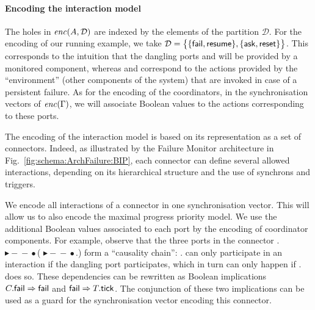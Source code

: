 \documentclass{llncs}
\newcommand{\Simon}{\\\hfill\mdash Simon}
\newcommand{\noteSB}[2][color=green!40, size=\tiny]{\todo[#1]{{#2}\Simon}}
\newcommand{\Ludo}{\\\hfill\mdash Ludo}
\newcommand{\noteLH}[2][color=orange!40, size=\tiny]{\todo[#1]{{#2}\Ludo}}
\newcommand{\add}[2][Added]{\todo[color=blue!20, size=\tiny]{#1}{\color{blue}#2}}
\newcommand{\addSB}[1]{\add[Added by Simon]{#1}}
\newcommand{\tupleDeli}{(}
\newcommand{\tupleDelii}{)}
\newcommand{\setTupleDelims}[2][(]{
  \renewcommand{\tupleDeli}{#1}%
  \ifx#2\relax\else\renewcommand{\tupleDelii}{#2}\fi%
}
\newcommand{\tuplebase}[2][\ensuremath{,\allowbreak}]{%
  \def\nextitem{\def\nextitem{#1}}%
  \renewcommand*{\do}[1]{\nextitem ##1}%
  \tupleDeli\docsvlist{#2}\tupleDelii%
}
\newcommand{\pNetTuple}[2][\ensuremath{,\allowbreak}]{%
  \setTupleDelims[\mylangle]{\myrangle}%
  \tuplebase[#1]{#2}%
}
\newcommand{\fig}[1]{Fig.~\ref{fig:#1}}
\newcommand{\cC}{\ensuremath{\mathcal{C}}}
\newcommand{\cD}{\ensuremath{\mathcal{D}}}
\newcommand{\mdash}[1][]{---#1}
\newcommand{\bydef}[1]{\ensuremath{\stackrel{\mathit{\scriptscriptstyle def}}{#1}}}
\newcommand{\trigsynch}{%
  \mbox{\ensuremath{\blacktriangleright\!\!\!-\!\!\!-\!\!\!\bullet}}}
\newcommand{\nopri}[1][]{\ensuremath{\mathit{enc}%
    \ifx#1\relax\else(#1)\fi}}
\newcommand{\partition}{\cD}
\begin{document}
\paragraph{Encoding the interaction model}
The holes in $\nopri[A, \partition]$ are indexed by the elements of
the partition \partition.  For the encoding of our running example, we
take $\partition = \bigl\{\{\PortFail, \PortResume\},\{\PortAsk,
\PortReset\}\bigr\}$.  This corresponds to the intuition that the
dangling ports {\PortFail} and {\PortResume} will be provided by a
monitored component, whereas {\PortAsk} and {\PortReset} correspond to
the actions provided by the ``environment'' (other components of the
system) that are invoked in case of a persistent failure.  As for
the encoding of the coordinators, in the synchronisation vectors of
\nopri[\Gamma], we will associate Boolean values to the actions
corresponding to these ports.

The encoding of the interaction model is based on its representation
as a set of connectors. %
%
Indeed, as illustrated by the Failure Monitor architecture in
\fig{schema:ArchFailure:BIP}, each connector can define several
allowed interactions, depending on its hierarchical structure and the
use of synchrons and triggers.

We encode all interactions of a connector in one synchronisation vector.  This will allow us to also encode the maximal progress priority model.
We use
the additional Boolean values associated to each port by the encoding
of coordinator components.  For example, observe that the three ports in 
the connector
{\NameTimer.\PortTick
  \trigsynch (\PortFail \trigsynch \NameCtrl.\PortFail)}
form a ``causality chain'': {\NameCtrl.\PortFail} can only
participate in an interaction if the dangling port {\PortFail}
participates, which in turn can only happen if
{\NameTimer.\PortTick} does so.  These dependencies can be rewritten
as Boolean implications $C.\mathsf{fail} \Rightarrow \mathsf{fail}$
and $\mathsf{fail} \Rightarrow T.\mathsf{tick}$.
%
The conjunction of these two implications can be used as a guard for
the synchronisation vector encoding this connector.
\end{document}
